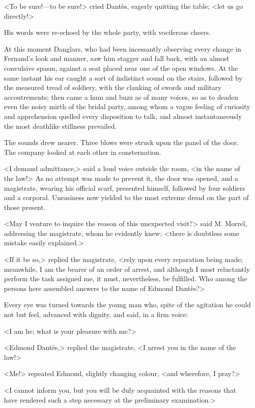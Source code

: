  <To be sure!—to be sure!> cried Dantès, eagerly quitting the table; <let us go directly!> 

 His words were re-echoed by the whole party, with vociferous cheers. 

 At this moment Danglars, who had been incessantly observing every change in Fernand's look and manner, saw him stagger and fall back, with an almost convulsive spasm, against a seat placed near one of the open windows. At the same instant his ear caught a sort of indistinct sound on the stairs, followed by the measured tread of soldiery, with the clanking of swords and military accoutrements; then came a hum and buzz as of many voices, so as to deaden even the noisy mirth of the bridal party, among whom a vague feeling of curiosity and apprehension quelled every disposition to talk, and almost instantaneously the most deathlike stillness prevailed. 

 The sounds drew nearer. Three blows were struck upon the panel of the door. The company looked at each other in consternation. 

 <I demand admittance,> said a loud voice outside the room, <in the name of the law!> As no attempt was made to prevent it, the door was opened, and a magistrate, wearing his official scarf, presented himself, followed by four soldiers and a corporal. Uneasiness now yielded to the most extreme dread on the part of those present. 

 <May I venture to inquire the reason of this unexpected visit?> said M. Morrel, addressing the magistrate, whom he evidently knew; <there is doubtless some mistake easily explained.> 

 <If it be so,> replied the magistrate, <rely upon every reparation being made; meanwhile, I am the bearer of an order of arrest, and although I most reluctantly perform the task assigned me, it must, nevertheless, be fulfilled. Who among the persons here assembled answers to the name of Edmond Dantès?> 

 Every eye was turned towards the young man who, spite of the agitation he could not but feel, advanced with dignity, and said, in a firm voice: 

 <I am he; what is your pleasure with me?> 

 <Edmond Dantès,> replied the magistrate, <I arrest you in the name of the law!> 

 <Me!> repeated Edmond, slightly changing colour, <and wherefore, I pray?> 

 <I cannot inform you, but you will be duly acquainted with the reasons that have rendered such a step necessary at the preliminary examination.> 

